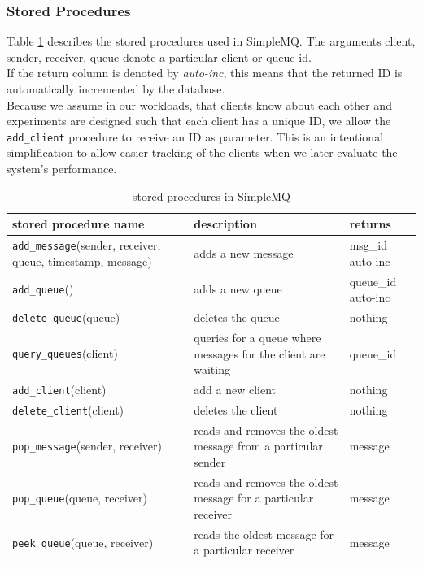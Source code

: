 \documentclass[11pt]{article}
\begin{document}
\subsubsection{Stored Procedures}\label{sec:stored-procedures}
Table \ref{tab:storedprocedures} describes the stored procedures used in SimpleMQ. The arguments client, sender, receiver, queue denote a particular client or queue id.
\\If the return column is denoted by \textit{auto-inc}, this means that the returned ID is automatically incremented by the database.
\\Because we assume in our workloads, that clients know about each other and experiments are designed such that each client has a unique ID, we allow the \texttt{add\_client} procedure to receive an ID as parameter. This is an intentional simplification to allow easier tracking of the clients when we later evaluate the system's performance.
\begin{table}[ht]
  \caption{stored procedures in SimpleMQ}
  \label{tab:storedprocedures}
  \begin{center}
    \begin{tabular}{|p{5cm}|p{6cm}|p{1.8cm}|}
       \hline
       \textbf{stored procedure name} & \textbf{description} & \textbf{returns}\\ \hline
       \texttt{add\_message}(sender, receiver, queue, timestamp, message) & adds a new message & msg\_id auto-inc\\ \hline
       \texttt{add\_queue}() & adds a new queue & queue\_id auto-inc\\ \hline
       \texttt{delete\_queue}(queue) & deletes the queue & nothing\\ \hline
       \texttt{query\_queues}(client) & queries for a queue where messages for the client are waiting & queue\_id\\ \hline
       \texttt{add\_client}(client) & add a new client & nothing\\ \hline
       \texttt{delete\_client}(client) & deletes the client & nothing\\ \hline
       \texttt{pop\_message}(sender, receiver) & reads and removes the oldest message from a particular sender & message\\ \hline
       \texttt{pop\_queue}(queue, receiver) & reads and removes the oldest message for a particular receiver & message\\ \hline
       \texttt{peek\_queue}(queue, receiver) & reads the oldest message for a particular receiver & message\\ \hline
    \end{tabular}
  \end{center}
\end{table}
\end{document}
